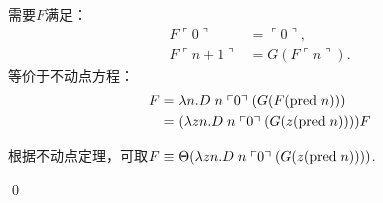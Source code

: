\begin{pf} \rm 需要$F$满足：
$$
\begin{aligned}
    F \ulcorner 0 \urcorner &= \ulcorner 0 \urcorner, \\
    F \ulcorner n+1 \urcorner &= G (F \ulcorner n \urcorner).        
\end{aligned}
$$
等价于不动点方程：
$$
\begin{aligned}
F &= \lambda n. D\;n\;\ulcorner 0 \urcorner\;(G (F (\mathrm{pred}\;n))) \\    
&= (\lambda z n. D\;n\;\ulcorner 0 \urcorner\;(G (z (\mathrm{pred}\;n)))) F
\end{aligned}
$$

根据不动点定理，可取$F\equiv \Theta (\lambda z n. D\;n\;\ulcorner 0 \urcorner\;(G (z (\mathrm{pred}\;n))))$.

    \qed 
\end{pf}